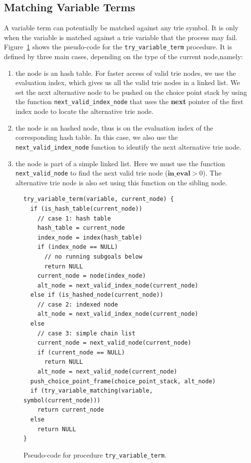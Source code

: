 \subsection{Matching Variable Terms}

A variable term can potentially be matched against any trie symbol. It
is only when the variable is matched against a trie variable that the
process may fail. Figure~\ref{fig:try_variable_term} shows the
pseudo-code for the \texttt{try\_variable\_term} procedure. It is defined
by three main cases, depending on the type of the current node,namely:

\begin{enumerate}
\item the node is an hash table. For faster access of valid trie  nodes, we use the evaluation index, which gives us all the valid
  trie nodes in a linked list. We set the next alternative node to be  pushed on the choice point stack by using the function
  \texttt{next\_valid\_index\_node} that uses the \textbf{next} pointer of the  first index node to locate the alternative trie node.
\item the node is an hashed node, thus is on the evaluation index of  the corresponding hash table. In this case, we also use the
  \texttt{next\_valid\_index\_node} function to identify the next
  alternative trie node.\item the node is part of a simple linked list. Here we must use the
  function \texttt{next\_valid\_node} to find the next valid trie node
  ($\textbf{in\_eval} > 0$). The alternative trie node is also set using this
  function on the sibling node.
\end{enumerate}

\begin{figure}[ht]
\begin{Verbatim}
try_variable_term(variable, current_node) {
  if (is_hash_table(current_node))
    // case 1: hash table
    hash_table = current_node
    index_node = index(hash_table)    
    if (index_node == NULL)
      // no running subgoals below
      return NULL    
    current_node = node(index_node)
    alt_node = next_valid_index_node(current_node)
  else if (is_hashed_node(current_node))
    // case 2: indexed node
    alt_node = next_valid_index_node(current_node)
  else
    // case 3: simple chain list
    current_node = next_valid_node(current_node)
    if (current_node == NULL)
      return NULL
    alt_node = next_valid_node(current_node)
  push_choice_point_frame(choice_point_stack, alt_node)
  if (try_variable_matching(variable, symbol(current_node)))
    return current_node
  else
    return NULL
}
\end{Verbatim}
\caption{Pseudo-code for procedure \texttt{try\_variable\_term}.}
\label{fig:try_variable_term}
\end{figure}

